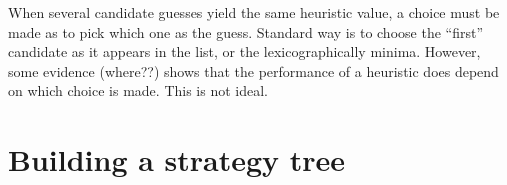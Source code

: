 When several candidate guesses yield the same heuristic value, a choice must be made as to pick which one as the guess. Standard way is to choose the ``first'' candidate as it appears in the list, or the lexicographically minima. However, some evidence (where??) shows that the performance of a heuristic does depend on which choice is made. This is not ideal.

\section{Building a strategy tree}
























